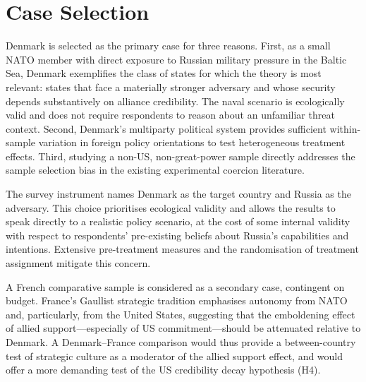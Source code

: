 \section{Case Selection}

Denmark is selected as the primary case for three reasons. First, as a small NATO member with direct exposure to Russian military pressure in the Baltic Sea, Denmark exemplifies the class of states for which the theory is most relevant: states that face a materially stronger adversary and whose security depends substantively on alliance credibility. The naval scenario is ecologically valid and does not require respondents to reason about an unfamiliar threat context. Second, Denmark's multiparty political system provides sufficient within-sample variation in foreign policy orientations to test heterogeneous treatment effects. Third, studying a non-US, non-great-power sample directly addresses the sample selection bias in the existing experimental coercion literature.

The survey instrument names Denmark as the target country and Russia as the adversary. This choice prioritises ecological validity and allows the results to speak directly to a realistic policy scenario, at the cost of some internal validity with respect to respondents' pre-existing beliefs about Russia's capabilities and intentions. Extensive pre-treatment measures and the randomisation of treatment assignment mitigate this concern.

A French comparative sample is considered as a secondary case, contingent on budget. France's Gaullist strategic tradition emphasises autonomy from NATO and, particularly, from the United States, suggesting that the emboldening effect of allied support---especially of US commitment---should be attenuated relative to Denmark. A Denmark--France comparison would thus provide a between-country test of strategic culture as a moderator of the allied support effect, and would offer a more demanding test of the US credibility decay hypothesis (H4).

\printbibliography


